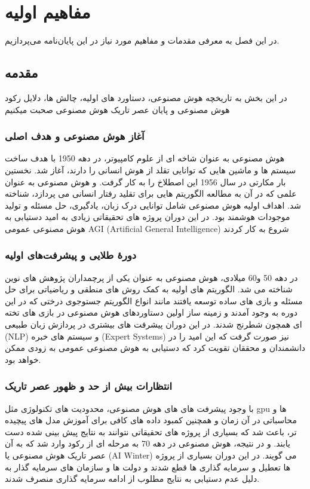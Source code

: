 \chapter{مفاهیم اولیه}
در این فصل به معرفی مقدمات و مفاهیم مورد نیاز در این پایان‌نامه می‌پردازیم. 
\section{مقدمه}
در این بخش به تاریخچه هوش مصنوعی، دستاورد های اولیه، چالش ها، دلایل رکود هوش مصنوعی و پایان عصر تاریک هوش مصنوعی صحبت میکنیم 



\subsection{آغاز هوش مصنوعی و هدف اصلی}

هوش مصنوعی به عنوان شاخه ای از علوم کامپیوتر، در دهه 1950 با هدف ساخت  سیستم ها و ماشین هایی که توانایی تقلد از هوش انسانی را دارند، آغاز شد.
نخستین بار مکارتی در سال 1956 این اصطلاخ را به کار گرفت. و هوش مصنوعی به عنوان علمی که در آن به مطالعه الگوریتم هایی برای تقلید رفتار انسانی می پردازد، شناخته شد.
اهداف اولیه هوش مصنوعی شامل توانایی درک زبان، یادگیری، حل مسئله و تولید موجودات هوشمند بود.
در این دوران پروژه های تحقیقاتی زیادی به امید دستیابی به هوش مصنوعی عمومی 
 AGI (Artificial General Intelligence)
شروع به کار کردند

\subsection{دورهٔ طلایی و پیشرفت‌های اولیه}
در دهه 50 و60 میلادی، هوش مصنوعی به عنوان یکی از پرچمداران پژوهش های نوین شناخته می شد.
الگوریتم های اولیه به کمک روش های منطقی و ریاضیاتی برای حل مسئله و بازی های ساده توسعه یافتند مانند انواع الگوریتم جستوجوی درختی که در این دوره به وجود آمدند و زمینه ساز اولین دستاوردهای هوش مصنوعی در بازی های تخته ای همچون شطرنج شدند.
در این دوران پیشرفت های بیشتری در پردازش زبان طبیعی (NLP)
و سیستم های خبره (Expert Systems) نیز صورت گرفت که این امید را در دانشمندان و محققان تقویت کرد که دستیابی به هوش مصنوعی عمومی به زودی ممکن خواهد بود.

\subsection{انتظارات بیش از حد و ظهور عصر تاریک}
با وجود پیشرفت های های هوش مصنوعی، محدودیت های تکنولوژی مثل gpu ها  و محاسباتی در آن زمان و همچنین کمبود داده های کافی برای آموزش مدل های پیچیده تر، باعث شد که بسیاری از پروژه های تحقیقاتی نتوانند به نتایج پیش بینی شده دست یابند. و در نتیجه، هوش مصنوعی در دهه 70 به مرحله ای از رکود وارد شد که به آن عصر تاریک هوش مصنوعی یا (AI Winter) می گویند.
در این دوران بسیاری از پروژه ها تعطیل و سرمایه گذاری ها قطع شدند و دولت ها و سازمان های سرمایه گذار به دلیل عدم دستیابی به نتایج مطلوب از ادامه سرمایه گذاری منصرف شدند.

